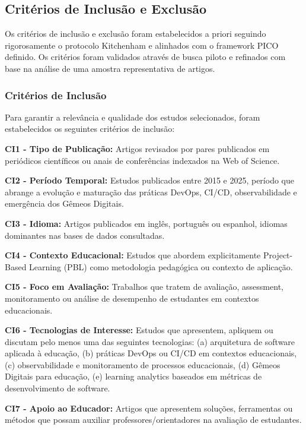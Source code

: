 \documentclass[english, spanish, brazilian]{RBIEarticle} %
\begin{document}
\subsection{Critérios de Inclusão e Exclusão}

Os critérios de inclusão e exclusão foram estabelecidos a priori seguindo rigorosamente o protocolo Kitchenham \parencite{Kitchenham2007} e alinhados com o framework PICO definido. Os critérios foram validados através de busca piloto e refinados com base na análise de uma amostra representativa de artigos.

\subsubsection{Critérios de Inclusão}

Para garantir a relevância e qualidade dos estudos selecionados, foram estabelecidos os seguintes critérios de inclusão:

\textbf{CI1 - Tipo de Publicação:} Artigos revisados por pares publicados em periódicos científicos ou anais de conferências indexados na Web of Science.

\textbf{CI2 - Período Temporal:} Estudos publicados entre 2015 e 2025, período que abrange a evolução e maturação das práticas DevOps, CI/CD, observabilidade e emergência dos Gêmeos Digitais.

\textbf{CI3 - Idioma:} Artigos publicados em inglês, português ou espanhol, idiomas dominantes nas bases de dados consultadas.

\textbf{CI4 - Contexto Educacional:} Estudos que abordem explicitamente Project-Based Learning (PBL) como metodologia pedagógica ou contexto de aplicação.

\textbf{CI5 - Foco em Avaliação:} Trabalhos que tratem de avaliação, assessment, monitoramento ou análise de desempenho de estudantes em contextos educacionais.

\textbf{CI6 - Tecnologias de Interesse:} Estudos que apresentem, apliquem ou discutam pelo menos uma das seguintes tecnologias: (a) arquitetura de software aplicada à educação, (b) práticas DevOps ou CI/CD em contextos educacionais, (c) observabilidade e monitoramento de processos educacionais, (d) Gêmeos Digitais para educação, (e) learning analytics baseados em métricas de desenvolvimento de software.

\textbf{CI7 - Apoio ao Educador:} Artigos que apresentem soluções, ferramentas ou métodos que possam auxiliar professores/orientadores na avaliação de estudantes.
\end{document}
